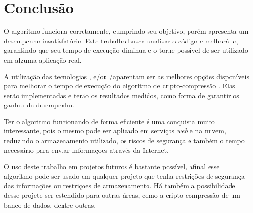 \chapter{Conclusão}
\label{cap6}

O algoritmo \gmpr funciona corretamente, cumprindo seu objetivo, porém apresenta um desempenho insatisfatório. Este trabalho busca analisar o código e melhorá-lo, garantindo que seu tempo de execução diminua e o torne possível de ser utilizado em alguma aplicação real.

A utilização das tecnologias \openMP, \mpi e/ou \cuda/\opencl aparentam ser as melhores opções disponíveis para melhorar o tempo de execução do algoritmo de cripto-compressão \gmpr. Elas serão implementadas e terão os resultados medidos, como forma de garantir os ganhos de desempenho.

Ter o algoritmo funcionando de forma eficiente é uma conquista muito interessante, pois o mesmo pode ser aplicado em serviços \textit{web} e na nuvem, reduzindo o armazenamento utilizado, os riscos de segurança e também o tempo necessário para enviar informações através da Internet.

O uso deste trabalho em projetos futuros é bastante possível, afinal esse algoritmo pode ser usado em qualquer projeto que tenha restrições de segurança das informações ou restrições de armazenamento. Há também a possibilidade desse projeto ser estendido para outras áreas, como a cripto-compressão de um banco de dados, dentre outras.